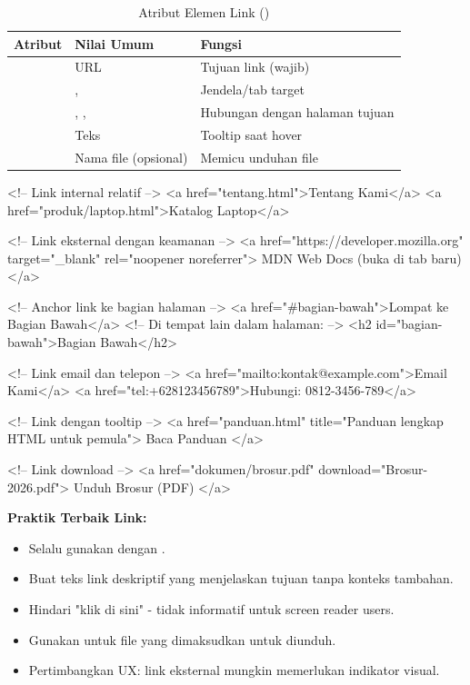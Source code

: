 \begin{table}[htbp]
\centering
\begin{tabular}{|P{3cm}|P{2.5cm}|P{6cm}|}
\hline
\textbf{Atribut} & \textbf{Nilai Umum} & \textbf{Fungsi} \\
\hline
{} & URL & Tujuan link (wajib) \\
\hline
{} & ,  & Jendela/tab target \\
\hline
{} & , ,  & Hubungan dengan halaman tujuan \\
\hline
{} & Teks & Tooltip saat hover \\
\hline
{} & Nama file (opsional) & Memicu unduhan file \\
\hline
\end{tabular}
\caption{Atribut Elemen Link ()}
\label{tab:link-attributes}
\end{table}

\begin{webcode}[language=HTML, caption={Contoh Berbagai Jenis Link}]
<!-- Link internal relatif -->
<a href="tentang.html">Tentang Kami</a>
<a href="produk/laptop.html">Katalog Laptop</a>

<!-- Link eksternal dengan keamanan -->
<a href="https://developer.mozilla.org" 
   target="_blank" 
   rel="noopener noreferrer">
   MDN Web Docs (buka di tab baru)
</a>

<!-- Anchor link ke bagian halaman -->
<a href="#bagian-bawah">Lompat ke Bagian Bawah</a>
<!-- Di tempat lain dalam halaman: -->
<h2 id="bagian-bawah">Bagian Bawah</h2>

<!-- Link email dan telepon -->
<a href="mailto:kontak@example.com">Email Kami</a>
<a href="tel:+628123456789">Hubungi: 0812-3456-789</a>

<!-- Link dengan tooltip -->
<a href="panduan.html" title="Panduan lengkap HTML untuk pemula">
   Baca Panduan
</a>

<!-- Link download -->
<a href="dokumen/brosur.pdf" download="Brosur-2026.pdf">
   Unduh Brosur (PDF)
</a>
\end{webcode}

\begin{catatan}
\textbf{Praktik Terbaik Link:}
\begin{itemize}[leftmargin=*]
  \item Selalu gunakan  dengan .
  \item Buat teks link deskriptif yang menjelaskan tujuan tanpa konteks tambahan.
  \item Hindari "klik di sini" - tidak informatif untuk screen reader users.
  \item Gunakan  untuk file yang dimaksudkan untuk diunduh.
  \item Pertimbangkan UX: link eksternal mungkin memerlukan indikator visual.
\end{itemize}
\end{catatan}

